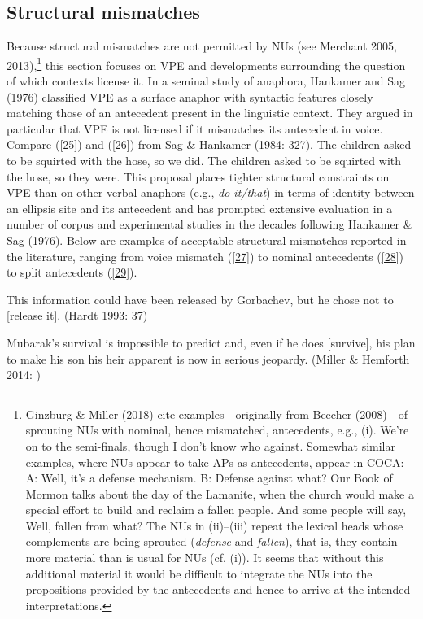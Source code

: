 \documentclass[output=paper]{langsci/langscibook}
\begin{document}
{\subsection{Structural mismatches}
 Because structural mismatches are not permitted by NUs (see Merchant 2005, 2013),\footnote{Ginzburg \& Miller (2018) cite examples---originally from Beecher (2008)---of sprouting NUs with nominal, hence mismatched, antecedents, e.g., (i).
 \ea We're on to the semi-finals, though I don't know who against.\z
 Somewhat similar examples, where NUs appear to take APs as antecedents, appear in COCA:
 \ea  A: Well, it's a defense mechanism. B: Defense against what?\z
 \ea Our Book of Mormon talks about the day of the Lamanite, when the church would make a special effort to build and reclaim a fallen people. And some people will say, Well, fallen from what? \z
The NUs in (ii)--(iii) repeat the lexical heads whose complements are being sprouted ({\it defense} and {\it fallen}), that is, they contain more material than is usual for NUs (cf. (i)). It seems that without this additional material it would be difficult to integrate the NUs into the propositions provided by the antecedents and hence to arrive at the intended interpretations.
} this section focuses on VPE and developments surrounding the question of which contexts license it. In a seminal study of anaphora, Hankamer and Sag (1976) classified VPE as a surface anaphor with syntactic features closely matching those of an antecedent present in the linguistic context. They argued in particular that VPE is not licensed if it mismatches its antecedent in voice. Compare (\ref{25}) and (\ref{26}) from Sag \& Hankamer (1984: 327).
\ea *The children asked to be squirted with the hose, so we did.  \label{25} \z
\ea The children asked to be squirted with the hose, so they were. \label{26} \z
This proposal places tighter structural constraints on VPE than on other verbal anaphors (e.g., {\it do it/that}) in terms of identity between an ellipsis site and its antecedent and has prompted extensive evaluation in a number of corpus and experimental studies in the decades following Hankamer \& Sag (1976). Below are examples of acceptable structural mismatches reported in the literature, ranging from voice mismatch (\ref{27}) to nominal antecedents (\ref{28}) to split antecedents (\ref{29}).

\ea This information could have been released by Gorbachev, but he chose not to [release it]. (Hardt 1993: 37) \label{27}\z

\ea Mubarak's survival is impossible to predict and, even if he does [survive], his plan to make his son his heir apparent is now in serious jeopardy. (Miller \& Hemforth 2014: )\label{28}\z

}
\end{document}
